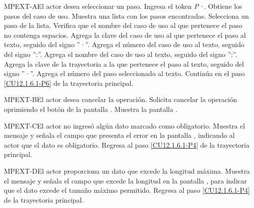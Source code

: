 	\begin{UCtrayectoriaA}{MPEXT-A}{El actor desea seleccionar un paso.}
		\UCpaso[\UCactor] Ingresa el token {\em P·}. 
		\UCpaso[\UCsist] Obtiene los pasos del caso de uso.
		\UCpaso[\UCsist] Muestra una lista con los pasos encontradas.
		\UCpaso[\UCactor] Selecciona un paso de la lista.
		\UCpaso[\UCsist] Verifica que el nombre del caso de uso al que pertenece el paso no contenga espacios. 
		\UCpaso[\UCsist] Agrega la clave del caso de uso al que pertenece el paso al texto, seguido del signo ''·''.
		\UCpaso[\UCsist] Agrega el número del caso de uso al texto, seguido del signo '':''.
		\UCpaso[\UCsist] Agrega el nombre del caso de uso al texto, seguido del signo '':''.
		\UCpaso[\UCsist] Agrega la clave de la trayectoria a la que pertenece el paso al texto, seguido del signo ''·''.
		\UCpaso[\UCsist] Agrega el número del paso seleccionado al texto.
		\UCpaso Continúa en el paso \ref{CU12.1.6.1-P6} de la trayectoria principal.
	\end{UCtrayectoriaA}

	\begin{UCtrayectoriaA}{MPEXT-B}{El actor desea cancelar la operación.}
		\UCpaso[\UCactor] Solicita cancelar la operación oprimiendo el botón  de la pantalla .
		\UCpaso[\UCsist] Muestra la pantalla .
	\end{UCtrayectoriaA}

	\begin{UCtrayectoriaA}{MPEXT-C}{El actor no ingresó algún dato marcado como obligatorio.}
		\UCpaso[\UCsist] Muestra el mensaje  y señala el campo que presenta el error en la pantalla , indicando al actor que el dato es obligatorio.
		\UCpaso Regresa al paso \ref{CU12.1.6.1-P4} de la trayectoria principal.
	\end{UCtrayectoriaA}

	\begin{UCtrayectoriaA}{MPEXT-D}{El actor proporciona un dato que excede la longitud máxima.}
		\UCpaso[\UCsist] Muestra el mensaje  y señala el campo que excede la longitud en la pantalla , para indicar que el dato excede el tamaño máximo permitido.
		\UCpaso Regresa al paso \ref{CU12.1.6.1-P4} de la trayectoria principal.
	\end{UCtrayectoriaA}

